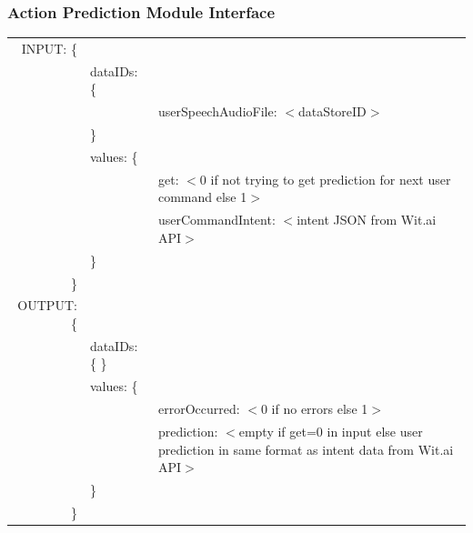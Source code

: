 \documentclass[onecolumn, draftclsnofoot,10pt, compsoc]{IEEEtran}
\begin{document}
        \subsubsection{Action Prediction Module Interface}
            \begin{tabular}[t]{r l p{4.5in}}
                INPUT: \{ & & \\
                & dataIDs: \{ & \\
                & & userSpeechAudioFile: $<$dataStoreID$>$ \\
                & \} & \\
                & values: \{ & \\
                & & get: $<$0 if not trying to get prediction for next user command else 1$>$ \\
                & & userCommandIntent: $<$intent JSON from Wit.ai API$>$ \\
                & \} & \\
                \} & & \\
                OUTPUT: \{ & & \\
                & dataIDs: \{ \} & \\
                & values: \{ & \\
                & & errorOccurred: $<$0 if no errors else 1$>$ \\
                & & prediction: $<$empty if get=0 in input else user prediction in same format as intent data from Wit.ai API$>$ \\
                & \} & \\
                \} & & \\
            \end{tabular}
\end{document}
